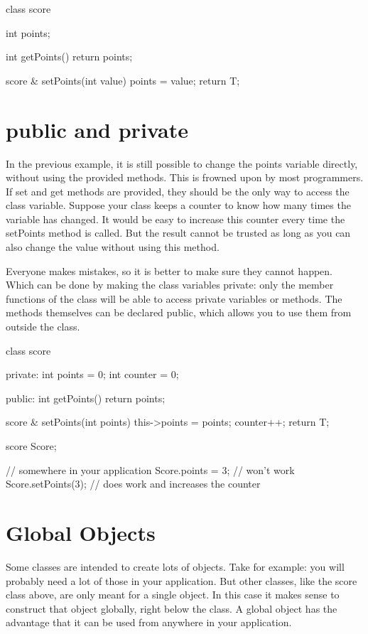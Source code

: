 \begin{code}
class score {
  int points;
  
  int getPoints() {
    return points;
  }
  
  score & setPoints(int value) {
    points = value;
    return T;
  } 
}
\end{code}

\section{public and private}
In the previous example, it is still possible to change the points variable directly, without using the provided methods. This is frowned upon by most programmers. If set and get methods are provided, they should be the only way to access the class variable. Suppose your class keeps a counter to know how many times the variable has changed. It would be easy to increase this counter every time the setPoints method is called. But the result cannot be trusted as long as you can also change the value without using this method.

Everyone makes mistakes, so it is better to make sure they cannot happen. Which can be done by making the class variables private: only the member functions of the class will be able to access private variables or methods. The methods themselves can be declared public, which allows you to use them from outside the class.


\begin{code}
class score {
private:
  int points  = 0;
  int counter = 0;
  
public:  
  int getPoints() {
    return points;
  }
  
  score & setPoints(int points) {
    this->points = points;
    counter++;
    return T;
  } 
}
score Score;

// somewhere in your application
Score.points = 3; // won't work
Score.setPoints(3); // does work and increases the counter
\end{code}

\section{Global Objects}
Some classes are intended to create lots of objects. Take  for example: you will probably need a lot of those in your application. But other classes, like the score class above, are only meant for a single object. In this case it makes sense to construct that object globally, right below the class. A global object has the advantage that it can be used from anywhere in your application.

